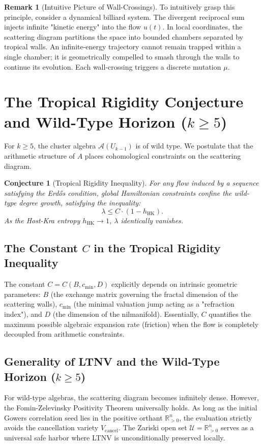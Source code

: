 \documentclass[11pt, a4paper, reqno]{amsart}
\newtheorem{conjecture}[theorem]{Conjecture}
\theoremstyle{definition}
\newtheorem{remark}[theorem]{Remark}
\newcommand{\R}{\mathbb{R}}
\newcommand{\Vcancel}{V_{\mathrm{cancel}}}
\newcommand{\hHK}{h_{\mathrm{HK}}}
\begin{document}
\begin{remark}[Intuitive Picture of Wall-Crossings]
To intuitively grasp this principle, consider a dynamical billiard system. The divergent reciprocal sum injects infinite "kinetic energy" into the flow $u(t)$. In local coordinates, the scattering diagram partitions the space into bounded chambers separated by tropical walls. An infinite-energy trajectory cannot remain trapped within a single chamber; it is geometrically compelled to smash through the walls to continue its evolution. Each wall-crossing triggers a discrete mutation $\mu$.
\end{remark}

\section{The Tropical Rigidity Conjecture and Wild-Type Horizon \texorpdfstring{($k \ge 5$)}{(k >= 5)}}
For $k \ge 5$, the cluster algebra $\mathcal{A}(U_{k-1})$ is of wild type. We postulate that the arithmetic structure of $A$ places cohomological constraints on the scattering diagram.

\begin{conjecture}[Tropical Rigidity Inequality]
For any flow induced by a sequence satisfying the Erd\H{o}s condition, global Hamiltonian constraints confine the wild-type degree growth, satisfying the inequality:
\begin{equation}
    \lambda \le C \cdot (1 - \hHK).
\end{equation}
As the Host-Kra entropy $\hHK \to 1$, $\lambda$ identically vanishes.
\end{conjecture}

\subsection{The Constant \texorpdfstring{$C$}{C} in the Tropical Rigidity Inequality}
The constant $C = C(B, c_{\min}, D)$ explicitly depends on intrinsic geometric parameters: $B$ (the exchange matrix governing the fractal dimension of the scattering walls), $c_{\min}$ (the minimal valuation jump acting as a "refraction index"), and $D$ (the dimension of the nilmanifold). Essentially, $C$ quantifies the maximum possible algebraic expansion rate (friction) when the flow is completely decoupled from arithmetic constraints.

\subsection{Generality of LTNV and the Wild-Type Horizon \texorpdfstring{($k \ge 5$)}{(k >= 5)}}
For wild-type algebras, the scattering diagram becomes infinitely dense. However, the Fomin-Zelevinsky Positivity Theorem universally holds. As long as the initial Gowers correlation seed lies in the positive orthant $\R_{>0}^n$, the evaluation strictly avoids the cancellation variety $\Vcancel$. The Zariski open set $\mathcal{U} = \R_{>0}^n$ serves as a universal safe harbor where LTNV is unconditionally preserved locally.
\end{document}
